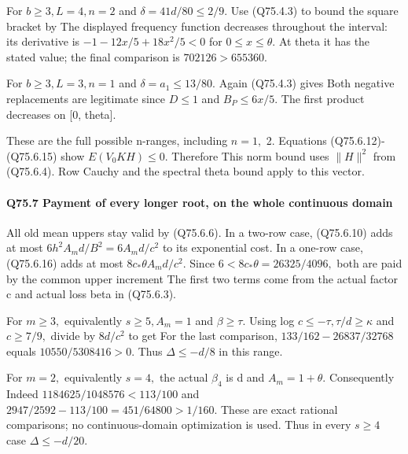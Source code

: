 For \(b\ge 3,\allowbreak  L=4,\allowbreak  n=2\) and \(\delta=41d/80\le 2/9.\) Use (Q75.4.3) to bound
the square bracket by
The displayed frequency function decreases throughout the interval:
its derivative is \(-1-12x/5+18x^2/5<0\) for \(0\le x\le\theta\). At theta it
has the stated value; the final comparison is \(702126>655360.\)

For \(b\ge 3,\allowbreak  L=3,\allowbreak  n=1\) and \(\delta=a_1\le 13/80.\) Again (Q75.4.3) gives
Both negative replacements are legitimate since \(D\le 1\) and
\(B_P\le 6x/5.\) The first product decreases on [0, theta].

These are the full possible n-ranges, including \(n=1,\allowbreak \) 2. Equations
(Q75.6.12)-(Q75.6.15) show \(E(V_0 KH)\le 0.\) Therefore
This norm bound uses
\(\lVert H\rVert ^2\) from (Q75.6.4). Row Cauchy and the spectral theta bound apply to this vector.

\paragraph{Q75.7 Payment of every longer root, on the whole continuous domain}

All old mean uppers stay valid by (Q75.6.6). In a two-row case, (Q75.6.10)
adds at most \(6h^2A_m d/B^2=6A_m d/c^2\) to its exponential cost.
In a one-row case, (Q75.6.16) adds at most \(8c_*\theta A_m d/c^2.\)
Since \(6<8c_*\theta=26325/4096,\allowbreak \) both are paid by the common upper
increment
The first two terms come from the actual factor c and actual loss
beta in (Q75.6.3). 

For \(m\ge 3,\allowbreak \) equivalently \(s\ge 5,\allowbreak  A_m=1\) and \(\beta\ge \tau.\) Using
log \(c\le -\tau,\allowbreak  \tau/d\ge \kappa\) and \(c\ge 7/9,\allowbreak \) divide by \(8d/c^2\) to get
For the last comparison, \(133/162-26837/32768\) equals
\(10550/5308416>0.\) Thus \(\Delta\le -d/8\) in this range.

For \(m=2,\allowbreak \) equivalently \(s=4,\allowbreak \) the actual \(\beta_4\) is d and
\(A_m=1+\theta.\) Consequently
Indeed \(1184625/1048576<113/100\) and
\(2947/2592-113/100=451/64800>1/160.\) These are exact rational comparisons;
no continuous-domain optimization is used.
Thus in every \(s\ge 4\) case \(\Delta\le -d/20.\)

